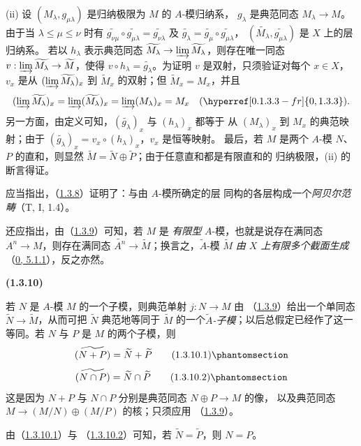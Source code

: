\documentclass[UTF8,fontset=none,11pt,oneside,openany]{ctexbook}
\newenvironment{env}[1][]{%
  \par\medskip\noindent\textbf{(#1)}\ %
}{\par}
\newcommand{\oldpage}[2][]{%
  \hypertarget{ega-source-page-#1-#2}{}%
  \marginnote{\scriptsize\textbf{#1}~|~#2}\ignorespaces}
\let\EGAOriginalLabel\label
\renewcommand{\label}[1]{\phantomsection\EGAOriginalLabel{#1}}
\begin{document}
(ii) 设 $(M_\lambda,g_{\mu\lambda})$ 是归纳极限为 $M$ 的 $A$-模归纳系，
$g_\lambda$ 是典范同态 $M_\lambda\to M$。由于当
$\lambda\leq\mu\leq\nu$ 时有
$\widetilde{g_{\nu\mu}}\circ\widetilde{g_{\mu\lambda}}
=\widetilde{g_{\nu\lambda}}$ 及
$\widetilde{g_\lambda}=\widetilde{g_\mu}\circ
\widetilde{g_{\mu\lambda}}$，
$(\widetilde{M_\lambda},\widetilde{g_{\mu\lambda}})$ 是 $X$ 上的层归纳系。
若以 $h_\lambda$ 表示典范同态
$\widetilde{M_\lambda}\to\varinjlim\widetilde{M_\lambda}$，则存在唯一同态
$v:\varinjlim\widetilde{M_\lambda}\to\widetilde{M}$，使得
$v\circ h_\lambda=\widetilde{g_\lambda}$。为证明 $v$ 是双射，只须验证对每个
$x\in X$，$v_x$ 是从 $(\varinjlim\widetilde{M_\lambda})_x$ 到
$\widetilde{M}_x$ 的双射；但 $\widetilde{M}_x=M_x$，并且
\[
  (\varinjlim\widetilde{M_\lambda})_x
  =\varinjlim(\widetilde{M_\lambda})_x
  =\varinjlim(M_\lambda)_x=M_x
  \quad(\hyperref[0.1.3.3-fr]{0, 1.3.3}).
\]
另一方面，由定义可知，$(\widetilde{g_\lambda})_x$ 与 $(h_\lambda)_x$ 都等于
从 $(M_\lambda)_x$ 到 $M_x$ 的典范映射；由于
$(\widetilde{g_\lambda})_x=v_x\circ(h_\lambda)_x$，$v_x$ 是恒等映射。
\oldpage[I]{88}
最后，若 $M$ 是两个 $A$-模 $N$、$P$ 的直和，则显然
$\widetilde{M}=\widetilde{N}\oplus\widetilde{P}$；由于任意直和都是有限直和的
归纳极限，(ii) 的断言得证。

应当指出，（\hyperref[I.1.3.8-fr]{1.3.8}）证明了：与由 $A$-模所确定的层
同构的各层构成一个\emph{阿贝尔范畴}（T, I, 1.4）。

还应指出，由（\hyperref[I.1.3.9-fr]{1.3.9}）可知，若 $M$ 是
\emph{有限型} $A$-模，也就是说存在满同态 $A^n\to M$，则存在满同态
$\widetilde{A^n}\to\widetilde{M}$；换言之，$\widetilde{A}$-模
$\widetilde{M}$ \emph{由 $X$ 上有限多个截面生成}
（\hyperref[0.5.1.1-fr]{0, 5.1.1}），反之亦然。

\begin{env}[1.3.10]
\label{I.1.3.10-fr}
若 $N$ 是 $A$-模 $M$ 的一个子模，则典范单射 $j:N\to M$ 由
（\hyperref[I.1.3.9-fr]{1.3.9}）给出一个单同态
$\widetilde{N}\to\widetilde{M}$，从而可把 $\widetilde{N}$ 典范地等同于
$\widetilde{M}$ 的一个\emph{$\widetilde{A}$-子模}；以后总假定已经作了这一
等同。若 $N$ 与 $P$ 是 $M$ 的两个子模，则
\begin{equation}
  \widetilde{(N+P)}=\widetilde{N}+\widetilde{P}
  \tag{1.3.10.1}\label{I.1.3.10.1-fr}
\end{equation}
\begin{equation}
  \widetilde{(N\cap P)}=\widetilde{N}\cap\widetilde{P}
  \tag{1.3.10.2}\label{I.1.3.10.2-fr}
\end{equation}
这是因为 $N+P$ 与 $N\cap P$ 分别是典范同态 $N\oplus P\to M$ 的像，
以及典范同态 $M\to(M/N)\oplus(M/P)$ 的核；只须应用
（\hyperref[I.1.3.9-fr]{1.3.9}）。

由（\hyperref[I.1.3.10.1-fr]{1.3.10.1}）与
（\hyperref[I.1.3.10.2-fr]{1.3.10.2}）可知，若
$\widetilde{N}=\widetilde{P}$，则 $N=P$。
\end{env}
\end{document}
